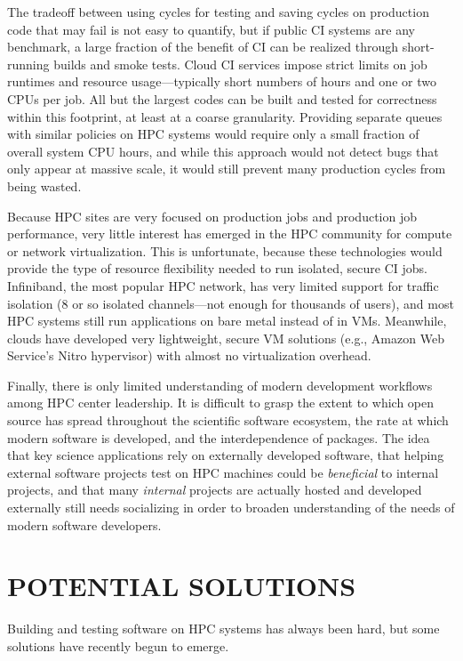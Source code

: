 \documentclass{IEEEcsmag}
\begin{document}
The tradeoff between using cycles for testing and saving cycles on production code that
may fail is not easy to quantify, but if public CI systems are any benchmark, a large
fraction of the benefit of CI can be realized through short-running builds and smoke
tests. Cloud CI services impose strict limits on job runtimes and resource
usage---typically short numbers of hours and one or two CPUs per job. All but the
largest codes can be built and tested for correctness within this footprint, at least at
a coarse granularity. Providing separate queues with similar policies on HPC systems
would require only a small fraction of overall system CPU hours, and while this approach
would not detect bugs that only appear at massive scale, it would still prevent many
production cycles from being wasted.

Because HPC sites are very focused on production jobs and production job performance,
very little interest has emerged in the HPC community for compute or network
virtualization. This is unfortunate, because these technologies would provide the type
of resource flexibility needed to run isolated, secure CI jobs. Infiniband, the most
popular HPC network, has very limited support for traffic isolation (8 or so isolated
channels---not enough for thousands of users), and most HPC systems still run
applications on bare metal instead of in VMs. Meanwhile, clouds have developed very
lightweight, secure VM solutions (e.g., Amazon Web Service's Nitro hypervisor) with
almost no virtualization overhead.

Finally, there is only limited understanding of modern development workflows among HPC
center leadership. It is difficult to grasp the extent to which open source has spread
throughout the scientific software ecosystem, the rate at which modern software is
developed, and the interdependence of packages. The idea that key science applications
rely on externally developed software, that helping external software projects test on
HPC machines could be {\it beneficial} to internal projects, and that many {\it
  internal} projects are actually hosted and developed externally still needs
socializing in order to broaden understanding of the needs of modern software
developers.

\section{POTENTIAL SOLUTIONS}

Building and testing software on HPC systems has always been hard, but some solutions
have recently begun to emerge.
\end{document}
